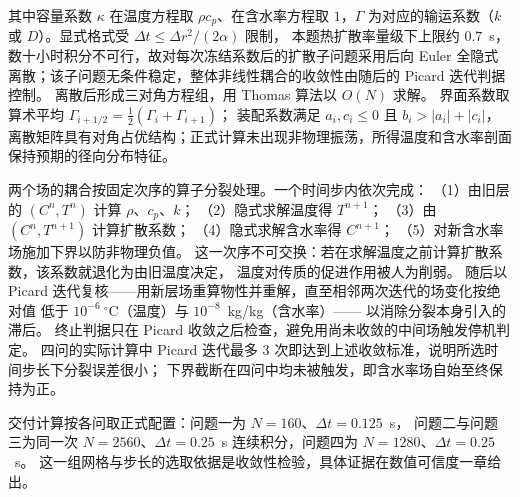 其中容量系数 $\kappa$ 在温度方程取 $\rho c_p$、在含水率方程取 $1$，$\Gamma$ 为对应的输运系数（$k$ 或 $D$）。显式格式受 $\Delta t\le\Delta r^2/(2\alpha)$ 限制，
本题热扩散率量级下上限约 $0.7$~s，数十小时积分不可行，故对每次冻结系数后的扩散子问题采用后向 Euler 全隐式离散；该子问题无条件稳定，整体非线性耦合的收敛性由随后的 Picard 迭代判据控制。
离散后形成三对角方程组，用 Thomas 算法以 $O(N)$ 求解。
界面系数取算术平均 $\Gamma_{i+1/2}=\tfrac12(\Gamma_i+\Gamma_{i+1})$；
装配系数满足 $a_i,c_i\le 0$ 且 $b_i>|a_i|+|c_i|$，离散矩阵具有对角占优结构；正式计算未出现非物理振荡，所得温度和含水率剖面保持预期的径向分布特征。

两个场的耦合按固定次序的算子分裂处理。一个时间步内依次完成：
（1）由旧层的 $(C^n,T^n)$ 计算 $\rho$、$c_p$、$k$；
（2）隐式求解温度得 $T^{n+1}$；
（3）由 $(C^n,T^{n+1})$ 计算扩散系数；
（4）隐式求解含水率得 $C^{n+1}$；
（5）对新含水率场施加下界以防非物理负值。
这一次序不可交换：若在求解温度之前计算扩散系数，该系数就退化为由旧温度决定，
温度对传质的促进作用被人为削弱。
随后以 Picard 迭代复核——用新层场重算物性并重解，直至相邻两次迭代的场变化按绝对值
低于 $10^{-6}~^\circ$C（温度）与 $10^{-8}$~kg/kg（含水率）——
以消除分裂本身引入的滞后。
终止判据只在 Picard 收敛之后检查，避免用尚未收敛的中间场触发停机判定。
四问的实际计算中 Picard 迭代最多 $3$ 次即达到上述收敛标准，说明所选时间步长下分裂误差很小；
下界截断在四问中均未被触发，即含水率场自始至终保持为正。

交付计算按各问取正式配置：问题一为 $N=160$、$\Delta t=0.125$~s，
问题二与问题三为同一次 $N=2560$、$\Delta t=0.25$~s 连续积分，问题四为 $N=1280$、$\Delta t=0.25$~s。
这一组网格与步长的选取依据是收敛性检验，具体证据在数值可信度一章给出。
